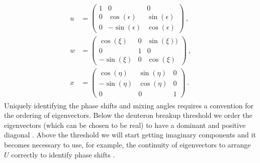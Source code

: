\documentclass[aps,prc,showpacs,twocolumn,floatfix,nobibnotes,nofootinbib,amsmath,amssymb,longbibliography]{revtex4-2}
\begin{document}
\begin{align}
	\begin{split}
	u &=
	\begin{pmatrix}
	1 & 0 & 0 \\
	0 & \cos(\epsilon) & \sin(\epsilon) \\
	0 & -\sin(\epsilon) & \cos(\epsilon)
	\end{pmatrix} \:, \\
	w &=
	\begin{pmatrix}
	\cos(\xi) & 0 & \sin(\xi)) \\
	0 & 1 & 0 \\
	-\sin(\xi) & 0 & \cos(\xi)
	\end{pmatrix} \:, \\
	x &=
	\begin{pmatrix}
	\cos(\eta) & \sin(\eta) & 0 \\
	-\sin(\eta) & \cos(\eta) & 0 \\
	0 & 0 & 1
	\end{pmatrix} \:.
	\end{split}
\end{align}
Uniquely identifying the phase shifts and mixing angles requires a
convention for the ordering of eigenvectors. Below the deuteron
breakup threshold we order the eigenvectors (which can be chosen to be
real) to have a dominant and positive diagonal
\cite{Huber:1995zza}. Above the threshold we will start getting
imaginary components and it becomes necessary to use, for example, the
continuity of eigenvectors to arrange $U$ correctly to identify phase
shifts \cite{Huber1995}.


\end{document}
